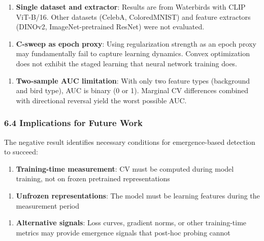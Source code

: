 \begin{enumerate}
\item \textbf{Single dataset and extractor}: Results are from Waterbirds with CLIP ViT-B/16. Other datasets (CelebA, ColoredMNIST) and feature extractors (DINOv2, ImageNet-pretrained ResNet) were not evaluated.
\end{enumerate}

\begin{enumerate}
\item \textbf{C-sweep as epoch proxy}: Using regularization strength as an epoch proxy may fundamentally fail to capture learning dynamics. Convex optimization does not exhibit the staged learning that neural network training does.
\end{enumerate}

\begin{enumerate}
\item \textbf{Two-sample AUC limitation}: With only two feature types (background and bird type), AUC is binary (0 or 1). Marginal CV differences combined with directional reversal yield the worst possible AUC.
\end{enumerate}

\subsubsection{6.4 Implications for Future Work}

The negative result identifies necessary conditions for emergence-based detection to succeed:

\begin{enumerate}
\item \textbf{Training-time measurement}: CV must be computed during model training, not on frozen pretrained representations
\end{enumerate}

\begin{enumerate}
\item \textbf{Unfrozen representations}: The model must be learning features during the measurement period
\end{enumerate}

\begin{enumerate}
\item \textbf{Alternative signals}: Loss curves, gradient norms, or other training-time metrics may provide emergence signals that post-hoc probing cannot
\end{enumerate}

